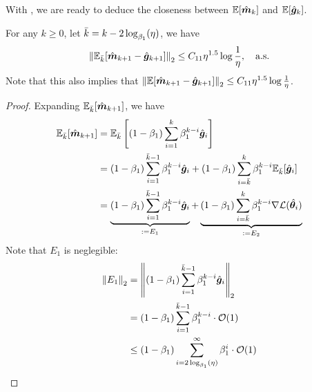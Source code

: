 With , we are ready to deduce the closeness between $\mathbb{E}[\hat{{\bm{m}}}_k]$ and $\mathbb{E}[\hat{{\bm{g}}}_k]$.
\begin{lemma}\label{E-mk-gk-closeness}
    For any $k \geq 0$, let $\Bar{k} = k - 2\log_{\beta_1}(\eta)$, we have 
    \begin{align*}
        \left\|\mathbb{E}_{\Bar{k}}[\hat{{\bm{m}}}_{k+1} - \hat{{\bm{g}}}_{k+1}]\right\|_2 \leq C_{11} \eta^{1.5}\log\frac{1}{\eta}, \quad \text{a.s.}
    \end{align*} 
    Note that this also implies that $\left\|\mathbb{E}[\hat{{\bm{m}}}_{k+1} - \hat{{\bm{g}}}_{k+1}]\right\|_2 \leq C_{11} \eta^{1.5} \log \frac{1}{\eta}$.
\end{lemma}


\begin{proof}
    Expanding $\mathbb{E}_{\Bar{k}}[\hat{{\bm{m}}}_{k+1}]$, we have 
    \begin{align*}
        \mathbb{E}_{\Bar{k}}[\hat{{\bm{m}}}_{k+1}] &= \mathbb{E}_{\Bar{k}}\left[(1-\beta_1)\sum_{i=1}^{k}\beta_1^{k-i}\hat{{\bm{g}}}_i\right] \\
        &= (1-\beta_1)\sum_{i=1}^{\Bar{k}-1}\beta_1^{k-i}\hat{{\bm{g}}}_i + (1-\beta_1)\sum_{i=\Bar{k}}^{k}\beta_1^{k-i}\mathbb{E}_{\Bar{k}}[\hat{{\bm{g}}}_{i}]\\
        &= \underbrace{(1-\beta_1)\sum_{i=1}^{\Bar{k}-1}\beta_1^{k-i}\hat{{\bm{g}}}_i}_{:=E_1} + \underbrace{(1-\beta_1)\sum_{i=\Bar{k}}^{k}\beta_1^{k-i}\nabla \mathcal{L}(\hat{{\bm{\theta}}}_{i})}_{:=E_2}\\
    \end{align*}
    Note that $E_1$ is neglegible:
    \begin{align*}
        \lnormtwo{E_1} &= \lnormtwo{(1-\beta_1)\sum_{i=1}^{\Bar{k}-1}\beta_1^{k-i}\hat{\vg}_i} \\
        &=  (1-\beta_1)\sum_{i=1}^{\Bar{k}-1}\beta_1^{k-i} \cdot \O(1) \\
        &\leq  (1-\beta_1)\sum_{i=2\log_{\beta_1}(\eta)}^{\infty}\beta_1^{i} \cdot \O(1)\\

\end{align*}
\end{proof}
